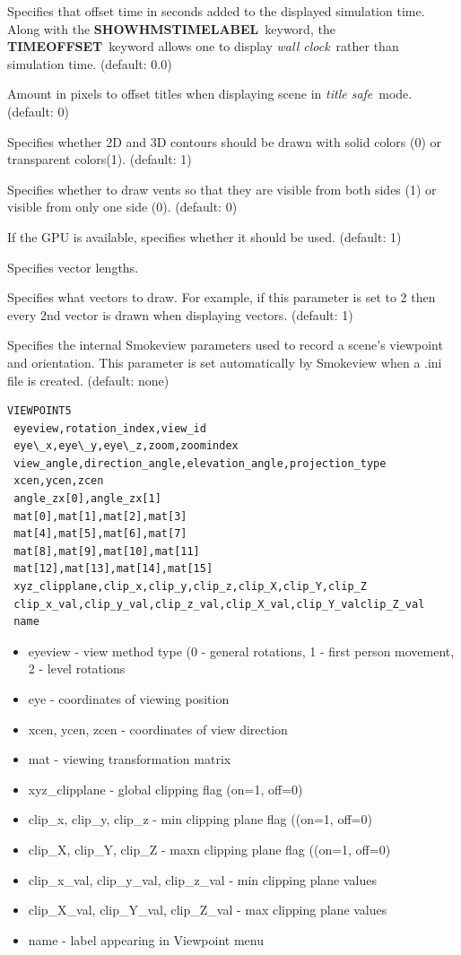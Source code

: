 \documentclass[11pt,twoside]{book}
\newcommand{\hitem}[1]{\item[{\bf #1} \hfill]}
\begin{document}
\hitem{TIMEOFFSET} Specifies that offset time in seconds added to
the displayed simulation time.  Along with the {\bf
SHOWHMSTIMELABEL}\ keyword, the {\bf TIMEOFFSET}\ keyword allows
one to display {\em wall clock}\ rather than simulation time.
(default: 0.0)

\hitem{TITLESAFE}Amount in pixels to offset titles when displaying
scene in {\em title safe}\ mode.   (default: 0)

\hitem{TRANSPARENT}Specifies whether 2D and 3D contours should be
drawn with solid colors (0) or transparent colors(1). (default: 1)

\hitem{TWOSIDEDVENTS}  Specifies whether to draw vents so that they are visible from
both sides (1) or visible from only one side (0).  (default: 0)

\hitem{USEGPU} If the GPU is available, specifies whether it should be used. (default: 1)


\hitem{VECLENGTH} Specifies vector lengths.

\hitem{VECTORSKIP}Specifies
what vectors to draw.  For example, if this parameter is set to 2 then
every 2nd vector is drawn when displaying vectors.
(default: 1)

\hitem{VIEWPOINT5}Specifies the internal Smokeview parameters used
to record a scene's viewpoint and orientation.  This parameter is
set automatically by Smokeview when a .ini file is created.
(default: none)

{\small
\begin{lstlisting}
VIEWPOINT5
 eyeview,rotation_index,view_id
 eye\_x,eye\_y,eye\_z,zoom,zoomindex
 view_angle,direction_angle,elevation_angle,projection_type
 xcen,ycen,zcen
 angle_zx[0],angle_zx[1]
 mat[0],mat[1],mat[2],mat[3]
 mat[4],mat[5],mat[6],mat[7]
 mat[8],mat[9],mat[10],mat[11]
 mat[12],mat[13],mat[14],mat[15]
 xyz_clipplane,clip_x,clip_y,clip_z,clip_X,clip_Y,clip_Z
 clip_x_val,clip_y_val,clip_z_val,clip_X_val,clip_Y_valclip_Z_val
 name
\end{lstlisting}
}

\begin{itemize}
\item eyeview - view method type (0 - general rotations, 1 - first person movement, 2 - level rotations
\item eye - coordinates of viewing position
\item xcen, ycen, zcen - coordinates of view direction
\item mat - viewing transformation matrix
\item xyz\_clipplane - global clipping flag (on=1, off=0)
\item clip\_x, clip\_y, clip\_z - min clipping plane flag ((on=1, off=0)
\item clip\_X, clip\_Y, clip\_Z - maxn clipping plane flag ((on=1, off=0)
\item clip\_x\_val, clip\_y\_val, clip\_z\_val - min clipping plane values
\item clip\_X\_val, clip\_Y\_val, clip\_Z\_val - max clipping plane values
\item name - label appearing in Viewpoint menu
\end{itemize}
\end{document}
